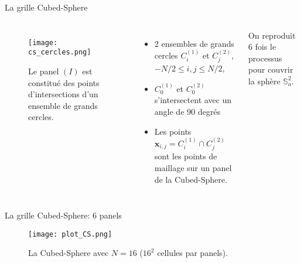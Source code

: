 \documentclass[11pt]{beamer}
\begin{document}
\begin{frame}{La grille Cubed-Sphere}
\begin{columns}
\begin{figure}[htbp]
\begin{center}
\texttt{[image: cs\_cercles.png]}
\end{center}
\caption{Le panel $(I)$ est constitué des points d'intersections d'un ensemble de grands cercles.}
\end{figure}  

\begin{itemize}
\item 2 ensembles de grands cercles $C_i^{(1)}$ et $C_j^{(2)}$, $-N/2 \leq i,j \leq N/2$,

\item $C_0^{(1)}$ et $C_0^{(2)}$ s'intersectent avec un angle de $90$ degrés

\item Les points $\mathbf{x}_{i,j}=C_i^{(1)} \cap C_j^{(2)}$ sont les points de maillage sur un panel de la Cubed-Sphere.
\end{itemize}

\begin{block}{}
On reproduit 6 fois le processus pour couvrir la sphère $\mathbb{S}_a^2$.
\end{block}

\end{columns}
\end{frame}













\begin{frame}{La grille Cubed-Sphere: 6 panels}
\begin{figure}
\begin{center}
\hspace{-1.cm}
\texttt{[image: plot\_CS.png]}
\caption{La Cubed-Sphere avec $N=16$ ($16^2$ cellules par panels).
}
\end{center}
\end{figure}
\end{frame}
\end{document}
